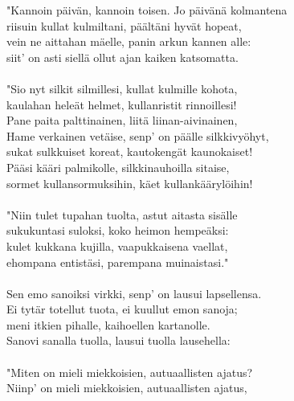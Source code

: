 "Kannoin päivän, kannoin toisen. Jo päivänä kolmantena         \\
riisuin kullat kulmiltani, päältäni hyvät hopeat,              \\
vein ne aittahan mäelle, panin arkun kannen alle:              \\
siit' on asti siellä ollut ajan kaiken katsomatta.             \\
                                                               \\
"Sio nyt silkit silmillesi, kullat kulmille kohota,            \\
kaulahan heleät helmet, kullanristit rinnoillesi!              \\
Pane paita palttinainen, liitä liinan-aivinainen,              \\
Hame verkainen vetäise, senp' on päälle silkkivyöhyt,          \\
sukat sulkkuiset koreat, kautokengät kaunokaiset!              \\
Pääsi kääri palmikolle, silkkinauhoilla sitaise,               \\
sormet kullansormuksihin, käet kullankäärylöihin!              \\
                                                               \\
"Niin tulet tupahan tuolta, astut aitasta sisälle              \\
sukukuntasi suloksi, koko heimon hempeäksi:                    \\
kulet kukkana kujilla, vaapukkaisena vaellat,                  \\
ehompana entistäsi, parempana muinaistasi."                    \\
                                                               \\
Sen emo sanoiksi virkki, senp' on lausui lapsellensa.          \\
Ei tytär totellut tuota, ei kuullut emon sanoja;               \\
meni itkien pihalle, kaihoellen kartanolle.                    \\
Sanovi sanalla tuolla, lausui tuolla lausehella:               \\
                                                               \\
"Miten on mieli miekkoisien, autuaallisten ajatus?             \\
Niinp' on mieli miekkoisien, autuaallisten ajatus,             \\
